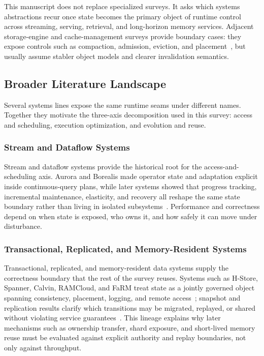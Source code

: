 \documentclass[manuscript]{acmart}
\begin{document}
This manuscript does not replace specialized surveys. It asks which systems abstractions recur once state becomes the primary object of runtime control across streaming, serving, retrieval, and long-horizon memory services. Adjacent storage-engine and cache-management surveys provide boundary cases: they expose controls such as compaction, admission, eviction, and placement~\cite{luo2020lsm,ali2011survey}, but usually assume stabler object models and clearer invalidation semantics.

\subsection{Broader Literature Landscape}

Several systems lines expose the same runtime seams under different names. Together they motivate the three-axis decomposition used in this survey: access and scheduling, execution optimization, and evolution and reuse.

\subsubsection{Stream and Dataflow Systems}

Stream and dataflow systems provide the historical root for the access-and-scheduling axis. Aurora and Borealis made operator state and adaptation explicit inside continuous-query plans, while later systems showed that progress tracking, incremental maintenance, elasticity, and recovery all reshape the same state boundary rather than living in isolated subsystems~\cite{abadi2003aurora,abadi2005borealis,carbone2015flink,carbone2015asynchronous,chandramouli2014trill,armbrust2018structured,murray2013differential,gulisano2012streamcloud}. Performance and correctness depend on when state is exposed, who owns it, and how safely it can move under disturbance.

\subsubsection{Transactional, Replicated, and Memory-Resident Systems}

Transactional, replicated, and memory-resident data systems supply the correctness boundary that the rest of the survey reuses. Systems such as H-Store, Spanner, Calvin, RAMCloud, and FaRM treat state as a jointly governed object spanning consistency, placement, logging, and remote access~\cite{kallman2008hstore,corbett2012spanner,thomson2012calvin,ousterhout2011ramcloud,dragojevic2014farm}; snapshot and replication results clarify which transitions may be migrated, replayed, or shared without violating service guarantees~\cite{chandy1985snapshot,ongaro2014raft}. This lineage explains why later mechanisms such as ownership transfer, shard exposure, and short-lived memory reuse must be evaluated against explicit authority and replay boundaries, not only against throughput.
\end{document}
